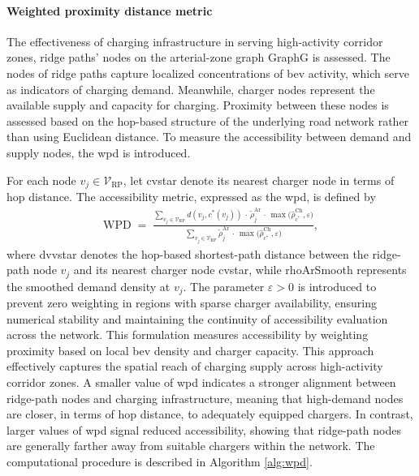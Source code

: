 \paragraph{Weighted proximity distance metric}
\label{subsubsec:wpd_metric}
The effectiveness of charging infrastructure in serving high-activity corridor zones, ridge paths' nodes on the arterial-zone graph \gls{GraphG} is assessed.
The nodes of ridge paths capture localized concentrations of \gls{bev} activity, which serve as indicators of charging demand. Meanwhile, charger nodes represent the available supply and capacity for charging. Proximity between these nodes is assessed based on the hop-based structure of the underlying road network rather than using Euclidean distance. To measure the accessibility between demand and supply nodes, the \gls{wpd} is introduced.


For each node $v_j \in \mathcal{V}_{\mathrm{RP}}$, let \gls{cvstar} denote its nearest charger node in terms of hop distance. The accessibility metric, expressed as the \gls{wpd}, is defined by
\begin{align}
\label{eq:wpd}
\mathrm{WPD} \;=\;
\frac{\sum\limits_{v_j \in \mathcal{V}_{\mathrm{RP}}}
    d(v_j, c^*(v_j)) \,\cdot\, \tilde{\rho}^{\mathrm{Ar}}_j \,\cdot\, \max\!\bigl(\widehat{\rho}^{\mathrm{Ch}}_{c^*}, \varepsilon\bigr)}
     {\sum\limits_{v_j \in \mathcal{V}_{\mathrm{RP}}}
    \tilde{\rho}^{\mathrm{Ar}}_j \,\cdot\, \max\!\bigl(\widehat{\rho}^{\mathrm{Ch}}_{c^*}, \varepsilon\bigr)},
\end{align}
where \gls{dvvstar} denotes the hop-based shortest-path distance between the ridge-path node $v_j$ and its nearest charger node \gls{cvstar}, while \gls{rhoArSmooth} represents the smoothed demand density at $v_j$. The parameter $\varepsilon > 0$ is introduced to prevent zero weighting in regions with sparse charger availability, ensuring numerical stability and maintaining the continuity of accessibility evaluation across the network.
This formulation measures accessibility by weighting proximity based on local \gls{bev} density and charger capacity. This approach effectively captures the spatial reach of charging supply across high-activity corridor zones. A smaller value of \gls{wpd} indicates a stronger alignment between ridge-path nodes and charging infrastructure, meaning that high-demand nodes are closer, in terms of hop distance, to adequately equipped chargers. In contrast, larger values of \gls{wpd} signal reduced accessibility, showing that ridge-path nodes are generally farther away from suitable chargers within the network. The computational procedure is described in Algorithm \ref{alg:wpd}.


